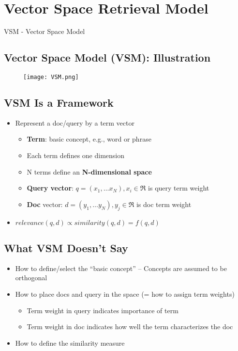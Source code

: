 \newpage
\section{Vector Space Retrieval Model}

VSM - Vector Space Model

\subsection{Vector Space Model (VSM): Illustration}

\begin{figure}[H]
    \centering
    \texttt{[image: VSM.png]}
\end{figure}

\subsection{VSM Is a Framework}
\begin{itemize}
\item Represent a doc/query by a term vector
\begin{itemize}
\item \textbf{Term}: basic concept, e.g., word or phrase
\item Each term defines one dimension
\item N terms define an \textbf{N-dimensional space}
\item \textbf{Query vector}: $q=(x_1, \dots x_N), x_i \in \Re$ is query term weight 
\item \textbf{Doc} vector: $d=(y_1, \dots y_N), y_j \in \Re$ is doc term weight
\end{itemize}
\item $relevance(q,d) \propto similarity(q,d)=f(q,d)$
\end{itemize}


\subsection{What VSM Doesn’t Say}
\begin{itemize}
\item How to define/select the “basic concept” – Concepts are assumed to be orthogonal
\item How to place docs and query in the space (= how to assign term weights)

\begin{itemize}
\item Term weight in query indicates importance of term 
\item Term weight in doc indicates how well the term characterizes the doc
\end{itemize}

\item How to define the similarity measure
\end{itemize}


